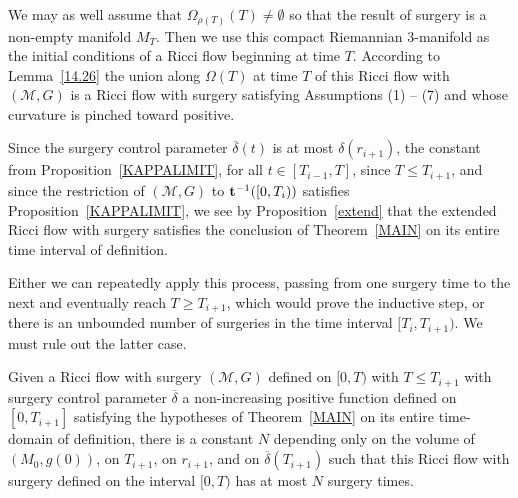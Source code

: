 We may as well assume that $\Omega_{\rho(T)}(T)\not=\emptyset$ so
that the result of surgery is a non-empty manifold $M_T$.
 Then we use this compact Riemannian
$3$-manifold as the initial conditions of a Ricci flow beginning
at time $T$. According to Lemma~\ref{14.26} the union along
$\Omega(T)$ at time $T$ of this Ricci flow with $({\mathcal M},G)$
is a Ricci flow with surgery satisfying Assumptions (1) -- (7) and whose
curvature is pinched toward positive.

Since the surgery  control parameter $\overline\delta(t)$ is at most
$\delta(r_{i+1})$, the constant from Proposition~\ref{KAPPALIMIT},
 for all $t\in [T_{i-1},T]$, since $T\le T_{i+1}$,
and since the restriction of $({\mathcal M},G)$ to ${\bf
t}^{-1}([0,T_i))$ satisfies Proposition~\ref{KAPPALIMIT}, we see by
Proposition~\ref{extend} that the extended Ricci flow with surgery
satisfies the conclusion of Theorem~\ref{MAIN} on its entire time
interval of definition.

Either we can repeatedly apply this process, passing from one surgery
time to the next and eventually reach $T\ge T_{i+1}$, which would
prove the inductive step, or there is an unbounded number of
surgeries in the time interval $[T_i,T_{i+1})$. We must rule out the
latter case.

\begin{lemma}
\label{lem:bounded-number-of-surgeries}
\label{bddsurgery}
Given a Ricci flow with surgery $({\mathcal M},G)$ defined on $[0,T)$ with
$T\le T_{i+1}$ with surgery control parameter $\overline\delta$ a
non-increasing positive function defined on $[0,T_{i+1}]$ satisfying the
hypotheses of Theorem~\ref{MAIN} on its entire time-domain of definition, there
is a constant $N$ depending only on the volume of $(M_0,g(0))$, on $T_{i+1}$,
on $r_{i+1}$, and on $\overline\delta(T_{i+1})$ such that this Ricci flow with
surgery defined on the interval $[0,T)$ has at most $N$ surgery times.
\end{lemma}


